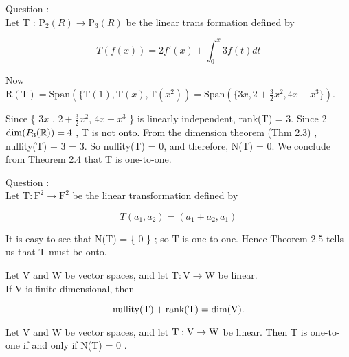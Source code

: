 \begin{example}[11] %
	Question : \\
	Let T : $\mathrm{P}_2(R) \rightarrow  \mathrm{P}_3(R) $ be the linear trans formation defined by 
	
	
	 \[T(f(x)) = 2f'(x) + \int_0^x3 f(t) dt \]
	
		\begin{sol*} 
$ $ \\ 	
Now $\mathrm{R}(\mathrm{T}) = \mathrm{Span}( \{ \mathrm{T}(1), \mathrm{T}(x), \mathrm{T}(x^2 )  ) = \mathrm{Span}( \{ 3x,  2+ \frac{3}{2}  x^2 , 4x + x^3 \} ) $. 

 \noindent Since \{ $3x$ , $ 2 + \frac{3}{2} x^2$, $4x + x^3$ \} is linearly independent, rank($\mathrm{T}$) = 3. Since
2
$\dim(P_3(\mathbb{R})) = 4$ , T is not onto. From the dimension theorem (Thm 2.3) , nullity(T) +
3 = 3. So nullity(T) = 0, and therefore, N(T) = {0}. We conclude from Theorem 2.4 that T is one-to-one.

	\end{sol*}

	\end{example}
\begin{example}[12] %
	 Question : \\ Let $\mathrm{T}: \mathrm{F}^2 \rightarrow \mathrm{F}^2 $ be the linear transformation defined by 
	 
	 \[T(a_1, a_2) = (a_1 + a_2, a_1)\]

	\begin{sol*} 
$ $ \\
		It is easy to see that N(T) = \{ 0 \} ; so T is one-to-one. Hence Theorem 2.5 tells us that T must be onto. 
	\end{sol*}

\end{example}

\begin{thm*}
$ $ \\	
Let V and W be vector spaces,
and let $ \mathrm{T} : \mathrm{V}  \rightarrow  \mathrm{W} $ be linear. \\ If V is finite-dimensional, then
 
 
 \[\rm	nullity(T) + rank(T) = dim(V).\]


\end{thm*}

\begin{thm*}[2.4]
$ $ \\	Let V and W be vector spaces, and let $\rm T: V  \rightarrow  W$ be
linear. Then T is one-to-one if and only if N(T) = {0 }.

\end{thm*}

